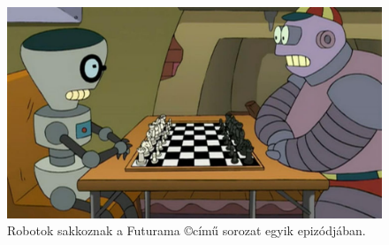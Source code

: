 \documentclass[twoside, a4paper, 12pt]{book}
\title{\THESISTITLE}
\author{\THESISAUTHOR}
\date{\THESISDEFENCEYEAR}
\renewcommand{\listoffigures}{\begingroup
\tocsection
\tocfile{\listfigurename}{lof}
\endgroup}
\renewcommand{\listoftables}{\begingroup
\tocsection
\tocfile{\listtablename}{lot}
\endgroup}
\begin{document}
\raggedbottom
\frontmatter
\pagestyle{empty}


\cleardoublepage

\null
\vspace*{\fill}
\begin{figure}[htbp]
	\centering
	\includegraphics[width=1.0\textwidth]{img/bots_chess.png}
	\caption{Robotok sakkoznak a Futurama \copyright című sorozat egyik epizódjában.}
	\label{fig:bots_chess}
\end{figure}
\vspace*{\fill}
\null
\cleardoublepage
\tableofcontents

\pagestyle{plain}
\setcounter{page}{1}









































\mainmatter

\newpage
\end{document}
